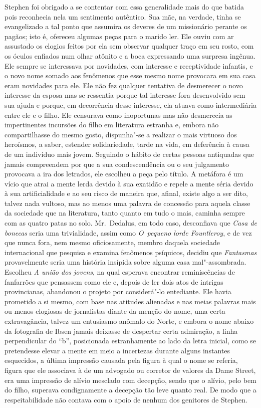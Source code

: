 Stephen foi obrigado a se contentar com essa generalidade mais do
que batida pois reconhecia nela um sentimento autêntico.  Sua mãe, na
verdade, tinha se evangelizado a tal ponto que assumira os deveres de
um missionário perante os pagãos; isto é, ofereceu algumas peças para o
marido ler.  Ele ouviu com ar assustado os elogios feitos por ela sem
observar qualquer traço em seu rosto, com os óculos enfiados num olhar
atônito e a boca expressando uma surpresa ingênua.  Ele sempre se
interessava por novidades, com interesse e receptividade infantis, e o
novo nome somado aos fenômenos que esse mesmo nome provocara em sua
casa eram novidades para ele.  Ele não fez qualquer tentativa de
desmerecer o novo interesse da esposa mas se ressentia porque tal
interesse fora desenvolvido sem sua ajuda e porque, em decorrência
desse interesse, ela atuava como intermediária entre ele e o filho.
Ele censurava como inoportunas mas não desmerecia as impertinentes
incursões do filho em literatura estranha e, embora não compartilhasse
do mesmo gosto, dispunha"-se a realizar o mais virtuoso dos heroísmos, a
saber, estender solidariedade, tarde na vida, em deferência à causa de
um indivíduo mais jovem.  Seguindo o hábito de certas pessoas
antiquadas que jamais compreendem por que a sua condescendência ou o
seu julgamento provocava a ira dos letrados, ele escolheu a peça pelo
título.  A metáfora é um vício que atrai a mente lerda devido à sua
exatidão e repele a mente séria devido à sua artificialidade e ao seu
risco de maneira que, afinal, existe algo a ser dito, talvez nada
vultoso, mas ao menos uma palavra de concessão para aquela classe da
sociedade que na literatura, tanto quanto em tudo o mais, caminha
sempre com as quatro patas no solo.  Mr.~Dedalus, em todo caso,
desconfiava que \textit{Casa de bonecas} seria uma trivialidade, assim
como \textit{O~pequeno lorde Fountleroy}, e de vez que nunca fora, nem
mesmo oficiosamente, membro daquela sociedade internacional que
pesquisa e examina fenômenos psíquicos, decidiu que \textit{Fantasmas}
provavelmente seria uma história insípida sobre alguma casa
mal"-assombrada.  Escolheu \textit{A união dos jovens}, na qual esperava		
encontrar reminiscências de fanfarrões que pensassem como ele e, depois
de ler dois atos de intrigas provincianas, abandonou o projeto por
considerá"-lo entediante.  Ele havia prometido a si mesmo, com base nas
atitudes alienadas e nas meias palavras mais ou menos elogiosas de jornalistas
diante da menção do nome, uma certa extravagância, talvez um entusiasmo
anômalo do Norte, e embora o nome abaixo da fotografia de Ibsen
jamais deixasse de despertar certa admiração, a linha perpendicular do
“b”, posicionada estranhamente ao lado da letra inicial, como se
pretendesse elevar a mente em meio a incertezas durante alguns
instantes esquecidos, a última impressão causada pela figura à qual o
nome se referia, figura que ele associava à de um advogado ou corretor
de valores da Dame Street, era uma impressão de alívio mesclado com
decepção, sendo que o alívio, pelo bem do filho,
superava condignamente a decepção tão leve quanto real.  De modo que a
respeitabilidade não contava com o apoio de nenhum dos genitores de
Stephen.

